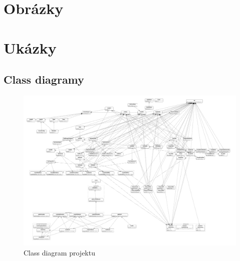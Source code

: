 \documentclass[a4paper,12pt]{report}
\begin{document}
\section{Obrázky}
\vspace{-64pt}
\listoffigures
\pagebreak
\section{Ukázky}
\vspace{-48pt}
\lstlistoflistings

\pagebreak
\sloppy
\begin{landscape}
\section{Class diagramy}
\label{sec:CD}
\begin{figure}[hbt!]
	\includegraphics[width=1\linewidth, height=0.55\linewidth]{img/ClassDiagramy/src_diagram_export.png}
	\caption{Class diagram projektu}
	\label{fig:enter-label}
\end{figure}
\pagebreak


\end{landscape}
\end{document}
